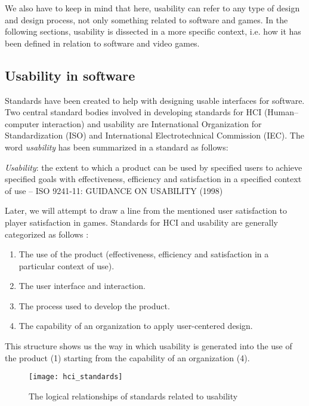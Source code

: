 We also have to keep in mind that here, usability can refer to any type of design and design process, not only something related to software and games. In the following sections, usability is dissected in a more specific context, i.e. how it has been defined in relation to software and video games.

\subsection{Usability in software}
Standards have been created to help with designing usable interfaces for software. Two central standard bodies involved in developing standards for HCI (Human--computer interaction) and usability are International Organization for Standardization (ISO) and International Electrotechnical Commission (IEC). The word \textit{usability} has been summarized in a standard as follows:

\begin{displayquote}

\textit{Usability}: the extent to which a product can be used by specified users to achieve specified goals with effectiveness, efficiency and satisfaction in a specified context of use -- ISO 9241-11: GUIDANCE ON USABILITY (1998) \cite{ISO1998}

\end{displayquote}

Later, we will attempt to draw a line from the mentioned user satisfaction to player satisfaction in games. Standards for HCI and usability are generally categorized as follows \cite{Bevan2006}:
\begin{enumerate}
	\item The use of the product (effectiveness, efficiency and satisfaction in a particular context of use).
	\item The user interface and interaction.
	\item The process used to develop the product.
	\item The capability of an organization to apply user-centered design.
\end{enumerate}

This structure shows us the way in which usability is generated into the use of the product (1) starting from the capability of an organization (4). 

\begin{figure}[h]
	\centering
	\texttt{[image: hci\_standards]}
	\caption{The logical relationships of standards related to usability \cite{Bevan2006}}
\end{figure}

